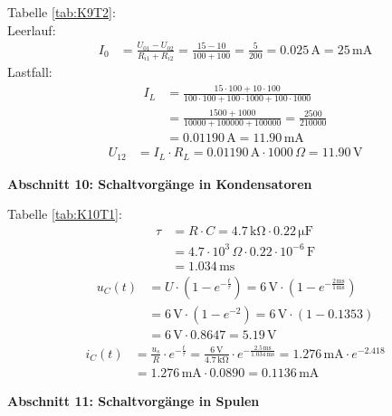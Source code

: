 Tabelle \ref{tab:K9T2}:\\
Leerlauf:
\begin{align*}
    I_0 &= \frac{U_{01} - U_{02}}{R_{i1} + R_{i2}}= \frac{15 - 10}{100 + 100}= \frac{5}{200} = 0.025 \, \mathrm{A}= 25 \, \mathrm{mA}
\end{align*}
Lastfall:
\begin{align*}
    I_L &= \frac{15 \cdot 100 + 10 \cdot 100}{100 \cdot 100 + 100 \cdot 1000 + 100 \cdot 1000} \\
    &= \frac{1500 + 1000}{10000 + 100000 + 100000} = \frac{2500}{210000} \\
    &= 0.01190 \, \mathrm{A} = 11.90 \, \mathrm{mA}
\end{align*}
\begin{align*}
    U_{12} &= I_L \cdot R_L= 0.01190 \, \mathrm{A} \cdot 1000 \, \Omega = 11.90 \, \mathrm{V}
\end{align*}

\large \textbf{Abschnitt 10: Schaltvorgänge in Kondensatoren}

Tabelle \ref{tab:K10T1}:
\begin{align*}
    \tau &= R \cdot C = 4.7 \, \mathrm{k\Omega} \cdot 0.22 \, \mathrm{\mu F} \\
    &= 4.7 \cdot 10^3 \, \Omega \cdot 0.22 \cdot 10^{-6} \, \mathrm{F} \\
    &= 1.034 \, \mathrm{ms}
\end{align*}
\begin{align*}
    u_C(t) &= U \cdot \left( 1 - e^{-\frac{t}{\tau}} \right) = 6 \, \mathrm{V} \cdot \left( 1 - e^{-\frac{2 \, \mathrm{ms}}{1 \, \mathrm{ms}}} \right) \\
    &= 6 \, \mathrm{V} \cdot \left( 1 - e^{-2} \right) = 6 \, \mathrm{V} \cdot \left( 1 - 0.1353 \right) \\
    &= 6 \, \mathrm{V} \cdot 0.8647 = 5.19 \, \mathrm{V}
\end{align*}
\begin{align*}
    i_C(t) &= \frac{u_s}{R} \cdot e^{-\frac{t}{\tau}} = \frac{6 \, \mathrm{V}}{4.7 \, \mathrm{k\Omega}} \cdot e^{-\frac{2.5 \, \mathrm{ms}}{1.034 \, \mathrm{ms}}} = 1.276 \, \mathrm{mA} \cdot e^{-2.418} \\
    &= 1.276 \, \mathrm{mA} \cdot 0.0890 = 0.1136 \, \mathrm{mA}
\end{align*}

\large \textbf{Abschnitt 11: Schaltvorgänge in Spulen}

